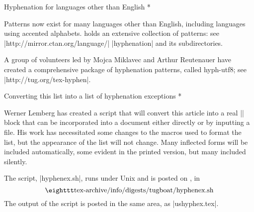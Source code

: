 %

\head * Hyphenation for languages \break other than English *

Patterns now exist for many languages other than English, including
languages using accented alphabets.
{\CTAN} holds an extensive collection of patterns: see
|http://mirror.ctan.org/language/| |hyphenation|
and its subdirectories.

A group of volunteers led by Mojca Miklavec and Arthur Reutenauer
have created a comprehensive package of hyphenation patterns, called
hyph-utf8; see |http://tug.org/tex-hyphen|.

\head * Converting this list into \break a list of hyphenation exceptions *

Werner Lemberg has created a script that will convert this article into
a real |\hyphenation| block that can be incorporated into a document
either directly or by inputting a file.  His work has necessitated
some changes to the macros used to format the list, but the appearance
of the list will not change.  Many inflected forms will be included
automatically, some evident in the printed version, but many included
silently.

The script, |hyphenex.sh|, runs under Unix and is posted on \CTAN, in
$$\hbox{\tt tex-archive/info/digests/tugboat/hyphenex.sh}$$
The output of the script is posted in the same area, as |ushyphex.tex|.



\def\printhyphens#1{%
 \setbox0\vbox{%
  \pretolerance-1\hyphenpenalty-10000%
  \hsize0pt\leftskip0pt\rightskip0pt\parfillskip0pt%
  \hbadness100\hfuzz\maxdimen
  \offinterlineskip
  \interlinepenalty0\clubpenalty0\widowpenalty0\brokenpenalty0%
  \noindent\hskip0pt #1\par
  \setbox0\lastbox \global\setbox1\hbox{\hbox{\unhbox0}}%
  \loop \unskip \setbox0\lastbox \ifhbox0%
   \global\setbox1\hbox{\hbox{\unhbox0}\discretionary{}{}{}\unhbox1}%
  \repeat}%
}

